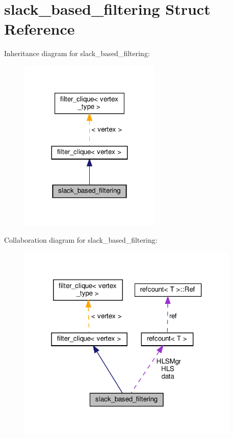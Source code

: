 \hypertarget{structslack__based__filtering}{}\section{slack\+\_\+based\+\_\+filtering Struct Reference}
\label{structslack__based__filtering}


Inheritance diagram for slack\+\_\+based\+\_\+filtering\+:
\nopagebreak
\begin{figure}[H]
\begin{center}
\leavevmode
\includegraphics[width=191pt]{d4/dae/structslack__based__filtering__inherit__graph}
\end{center}
\end{figure}


Collaboration diagram for slack\+\_\+based\+\_\+filtering\+:
\nopagebreak
\begin{figure}[H]
\begin{center}
\leavevmode
\includegraphics[width=301pt]{d6/d9e/structslack__based__filtering__coll__graph}
\end{center}
\end{figure}
